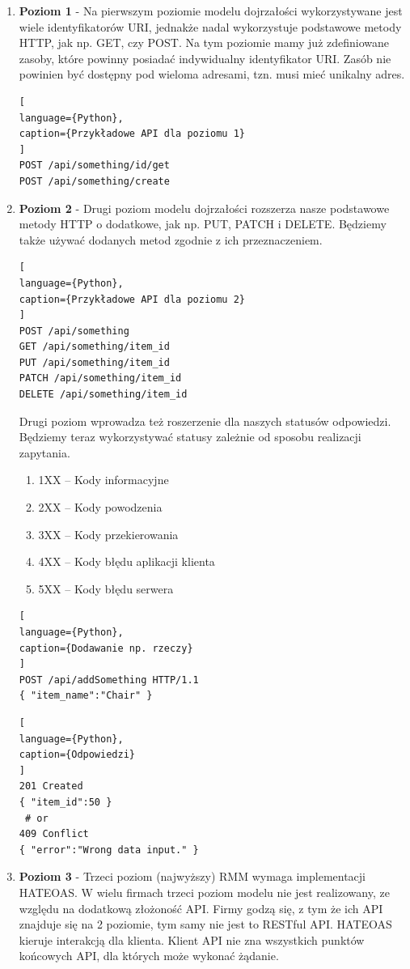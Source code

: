 \documentclass[oneside,polski,logo,indent]{amuthesis}
\begin{document}
\begin{enumerate}
\begin{enumerate}
\begin{enumerate}
\item \textbf{Poziom 1} - Na pierwszym poziomie modelu dojrzałości wykorzystywane jest wiele identyfikatorów URI, jednakże nadal wykorzystuje podstawowe metody HTTP, jak np. GET, czy POST. Na tym poziomie mamy już zdefiniowane zasoby, które powinny posiadać indywidualny identyfikator URI. Zasób nie powinien być dostępny pod wieloma adresami, tzn. musi mieć unikalny adres.

\begin{lstlisting}[
language={Python},
caption={Przykładowe API dla poziomu 1}
]
POST /api/something/id/get
POST /api/something/create
\end{lstlisting}

\item \textbf{Poziom 2} - Drugi poziom modelu dojrzałości rozszerza nasze podstawowe metody HTTP o dodatkowe, jak np. PUT, PATCH i DELETE. Będziemy także używać dodanych metod zgodnie z ich przeznaczeniem.

\begin{lstlisting}[
language={Python},
caption={Przykładowe API dla poziomu 2}
]
POST /api/something
GET /api/something/item_id
PUT /api/something/item_id
PATCH /api/something/item_id
DELETE /api/something/item_id
\end{lstlisting}

Drugi poziom wprowadza też roszerzenie dla naszych statusów odpowiedzi. Będziemy teraz wykorzystywać statusy zależnie od sposobu realizacji zapytania.
\begin{enumerate}
\item 1XX – Kody informacyjne
\item 2XX – Kody powodzenia
\item 3XX – Kody przekierowania
\item 4XX – Kody błędu aplikacji klienta
\item 5XX – Kody błędu serwera
\end{enumerate}

\begin{lstlisting}[
language={Python},
caption={Dodawanie np. rzeczy}
]
POST /api/addSomething HTTP/1.1
{ "item_name":"Chair" }
\end{lstlisting}

\begin{lstlisting}[
language={Python},
caption={Odpowiedzi}
]
201 Created
{ "item_id":50 }
 # or
409 Conflict
{ "error":"Wrong data input." }
\end{lstlisting}

\item \textbf{Poziom 3} - Trzeci poziom (najwyższy) RMM wymaga implementacji HATEOAS. W wielu firmach trzeci poziom modelu nie jest realizowany, ze względu na dodatkową złożoność API. Firmy godzą się, z tym że ich API znajduje się na 2 poziomie, tym samy nie jest to RESTful API. HATEOAS kieruje interakcją dla klienta. Klient API nie zna wszystkich punktów końcowych API, dla których może wykonać żądanie.


\end{enumerate}
\end{enumerate}
\end{enumerate}
\end{document}
